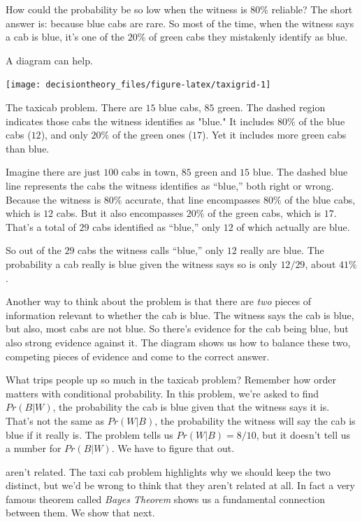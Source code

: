 \documentclass[]{tufte-book}
\begin{document}
How could the probability be so low when the witness is \(80\%\) reliable? The short answer is: because blue cabs are rare. So most of the time, when the witness says a cab is blue, it's one of the \(20\%\) of green cabs they mistakenly identify as blue.

A diagram can help.

\begin{marginfigure}
\texttt{[image: decisiontheory\_files/figure-latex/taxigrid-1]} \caption[The taxicab problem]{The taxicab problem. There are $15$ blue cabs, $85$ green. The dashed region indicates those cabs the witness identifies as "blue." It includes $80\%$ of the blue cabs ($12$), and only $20\%$ of the green ones ($17$). Yet it includes more green cabs than blue.}\label{fig:taxigrid}
\end{marginfigure}

Imagine there are just \(100\) cabs in town, \(85\) green and \(15\) blue. The dashed blue line represents the cabs the witness identifies as
``blue,'' both right or wrong. Because the witness is \(80\%\) accurate, that line encompasses \(80\%\) of the blue cabs, which is \(12\) cabs. But it also encompasses \(20\%\) of the green cabs, which is \(17\). That's a total of \(29\) cabs identified as ``blue,'' only \(12\) of which actually are blue.

So out of the \(29\) cabs the witness calls ``blue,'' only \(12\) really are blue. The probability a cab really is blue given the witness says so is only \(12/29\), about \(41\%\).

Another way to think about the problem is that there are \emph{two} pieces of information relevant to whether the cab is blue. The witness says the cab is blue, but also, most cabs are not blue. So there's evidence for the cab being blue, but also strong evidence against it. The diagram shows us how to balance these two, competing pieces of evidence and come to the correct answer.

What trips people up so much in the taxicab problem? Remember how order matters with conditional probability. In this problem, we're asked to find \(Pr(B | W)\), the probability the cab is blue given that the witness says it is. That's not the same as \(Pr(W | B)\), the probability the witness will say the cab is blue if it really is. The problem tells us \(Pr(W | B) = 8/10\), but it doesn't tell us a number for \(Pr(B | W)\). We have to figure that out.

 aren't related. The taxi cab problem highlights why we should keep the two distinct, but we'd be wrong to think that they aren't related at all. In fact a very famous theorem called \emph{Bayes Theorem} shows us a fundamental connection between them. We show that next.
\end{document}
